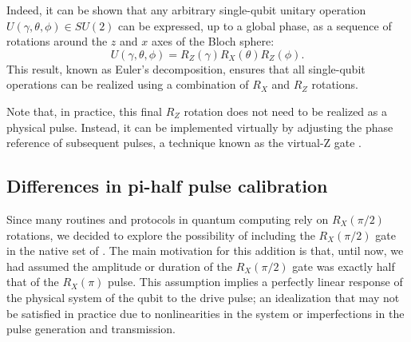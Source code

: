 Indeed, it can be shown that any arbitrary single-qubit unitary operation $ U(\gamma, \theta, \phi) \in SU(2) $ can be expressed, up to a global phase, as a sequence of rotations around the $z$ and $x$ axes of the Bloch sphere:
\begin{equation}
U(\gamma, \theta, \phi) = R_Z(\gamma) R_X(\theta) R_Z(\phi).
\end{equation}
This result, known as Euler's decomposition, ensures that all single-qubit operations can be realized using a combination of $ R_X $ and $ R_Z $ rotations. 

Note that, in practice, this final $R_Z$ rotation does not need to be realized as a physical pulse. 
Instead, it can be implemented virtually by adjusting the phase reference of subsequent pulses, a technique known as the virtual-Z gate \cite{McKay_2017}. \\

\subsection{Differences in pi-half pulse calibration}
Since many routines and protocols in quantum computing rely on $R_X(\pi/2)$ rotations, we decided to explore the possibility of including the $R_X(\pi/2)$ gate in the native set of \Qibolab.
The main motivation for this addition is that, until now, we had assumed the amplitude or duration of the $R_X(\pi/2)$ gate was exactly half that of the $R_X(\pi)$ pulse.
This assumption implies a perfectly linear response of the physical system of the qubit to the drive pulse; an idealization that may not be satisfied in practice due to nonlinearities in the system or imperfections in the pulse generation and transmission.

